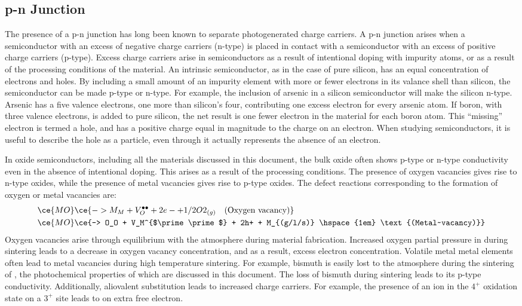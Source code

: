\subsection{p-n Junction}
\label{subsec:background.pnjunction}


The presence of a p-n junction has long been known to separate photogenerated charge
carriers. A p-n junction arises when a semiconductor with an excess of negative charge
carriers (n-type) is placed in contact with a semiconductor with an excess of positive
charge carriers (p-type). Excess charge carriers arise in semiconductors as a result of
intentional doping with impurity atoms, or as a result of the processing conditions of the
material. An intrinsic semiconductor, as in the case of pure silicon, has an equal
concentration of electrons and holes. By including a small amount of an impurity element
with more or fewer electrons in its valance shell than silicon, the semiconductor can be
made p-type or n-type. For example, the inclusion of arsenic in a silicon semiconductor
will make the silicon n-type. Arsenic has a five valence electrons, one more than
silicon's four, contributing one excess electron for every arsenic atom. If boron, with
three valence electrons, is added to pure silicon, the net result is one fewer electron in
the material for each boron atom. This ``missing'' electron is termed a hole, and has a
positive charge equal in magnitude to the charge on an electron. When studying
semiconductors, it is useful to describe the hole as a particle, even through it actually
represents the absence of an electron. 

In oxide semiconductors, including all the materials discussed in this document, the bulk
oxide often shows p-type or n-type conductivity even in the absence of intentional doping.
This arises as a result of the processing conditions. The presence of oxygen vacancies
gives rise to n-type oxides, while the presence of metal vacancies gives rise to p-type
oxides. The defect reactions corresponding to the formation of oxygen or metal vacancies
are:
\begin{align}
	\ce{MO}&\ce{-> M_M + V_O^{\bullet\bullet} + 2e- + 1/2O2_{(g)} \hspace{1em}
\text{(Oxygen~vacancy)}} \\
	\ce{MO}&\ce{-> O_O + V_M^{$\prime\prime$} + 2h+ + M_{(g/l/s)} \hspace{1em}
\text{(Metal~vacancy)}}
\end{align}
Oxygen vacancies arise through equilibrium with the atmosphere during material
fabrication. Increased oxygen partial pressure in during sintering leads to a decrease in
oxygen vacancy concentration, and as a result, excess electron concentration. Volatile
metal metal elements often lead to metal vacancies during high temperature sintering. For
example, bismuth is easily lost to the atmosphere during the sintering of , the
photochemical properties of which are discussed in this document. The loss of bismuth
during sintering leads to its p-type conductivity. Additionally, aliovalent substitution
leads to increased charge carriers. For example, the presence of an ion in the $4^{+}$
oxidation state on a $3^{+}$ site leads to on extra free electron.

